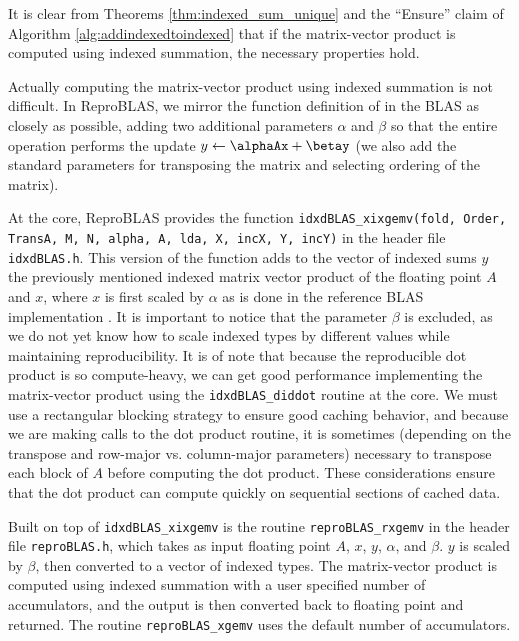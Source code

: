   It is clear from Theorems \ref{thm:indexed_sum_unique} and the ``Ensure'' claim of Algorithm \ref{alg:addindexedtoindexed} that if the matrix-vector product is computed using indexed summation, the necessary properties hold.

  Actually computing the matrix-vector product using indexed summation is not difficult. In ReproBLAS, we mirror the function definition of  in the BLAS as closely as possible, adding two additional parameters $\alpha$ and $\beta$ so that the entire operation performs the update $y \gets \alphaAx + \betay$ (we also add the standard parameters for transposing the matrix and selecting ordering of the matrix).

  At the core, ReproBLAS provides the function \texttt{idxdBLAS_xixgemv(fold, Order, TransA, M, N, alpha, A, lda, X, incX, Y, incY)} in the header file \texttt{idxdBLAS.h}. This version of the function adds to the vector of indexed sums $y$ the previously mentioned indexed matrix vector product of the floating point $A$ and $x$, where $x$ is first scaled by $\alpha$ as is done in the reference BLAS implementation \cite{netlib}. It is important to notice that the parameter $\beta$ is excluded, as we do not yet know how to scale indexed types by different values while maintaining reproducibility.
  It is of note that because the reproducible dot product is so compute-heavy, we can get good performance implementing the matrix-vector product using the \texttt{idxdBLAS_diddot} routine at the core. We must use a rectangular blocking strategy to ensure good caching behavior, and because we are making calls to the dot product routine, it is sometimes (depending on the transpose and row-major vs. column-major parameters) necessary to transpose each block of $A$ before computing the dot product. These considerations ensure that the dot product can compute quickly on sequential sections of cached data.

  Built on top of \texttt{idxdBLAS_xixgemv} is the routine \texttt{reproBLAS_rxgemv} in the header file \texttt{reproBLAS.h}, which takes as input floating point $A$, $x$, $y$, $\alpha$, and $\beta$. $y$ is scaled by $\beta$, then converted to a vector of indexed types. The matrix-vector product is computed using indexed summation with a user specified number of accumulators, and the output is then converted back to floating point and returned. The routine \texttt{reproBLAS_xgemv} uses the default number of accumulators.
